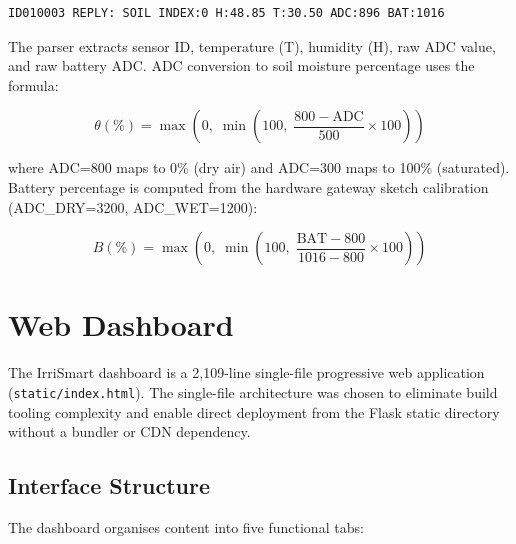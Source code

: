 \documentclass[12pt,a4paper]{report}
\begin{document}
\begin{verbatim}
ID010003 REPLY: SOIL INDEX:0 H:48.85 T:30.50 ADC:896 BAT:1016
\end{verbatim}

The parser extracts sensor ID, temperature (T), humidity (H), raw ADC value, and raw battery ADC. ADC conversion to soil moisture percentage uses the formula:

\begin{equation}
  \theta (\%) = \max\!\left(0,\;\min\!\left(100,\;\frac{800 - \text{ADC}}{500} \times 100\right)\right)
  \label{eq:adc}
\end{equation}

where ADC=800 maps to 0\% (dry air) and ADC=300 maps to 100\% (saturated). Battery percentage is computed from the hardware gateway sketch calibration (ADC\_DRY=3200, ADC\_WET=1200):

\begin{equation}
  B(\%) = \max\!\left(0,\;\min\!\left(100,\;\frac{\text{BAT} - 800}{1016 - 800} \times 100\right)\right)
  \label{eq:bat}
\end{equation}

\section{Web Dashboard}

The IrriSmart dashboard is a 2,109-line single-file progressive web application (\texttt{static/index.html}). The single-file architecture was chosen to eliminate build tooling complexity and enable direct deployment from the Flask static directory without a bundler or CDN dependency.

\subsection{Interface Structure}

The dashboard organises content into five functional tabs:
\end{document}
